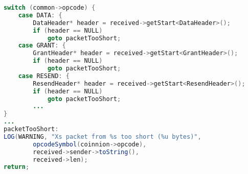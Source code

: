 \begin{lstlisting}[language=Java]
switch (common->opcode) { 
    case DATA: {
        DataHeader* header = received->getStart<DataHeader>(); 
        if (header == NULL)
            goto packetTooShort;
    case GRANT: {
        GrantHeader* header = received->getStart<GrantHeader>(); 
        if (header == NULL)
            goto packetTooShort;
    case RESEND: {
        ResendHeader* header = received->getStart<ResendHeader>(); 
        if (header == NULL)
            goto packetTooShort;
        ...
}
...
packetTooShort:
LOG(WARNING, "Xs packet from %s too short (%u bytes)", 
        opcodeSymbol(coinnion->opcode), 
        received->sender->toString(), 
        received->len);
return;
\end{lstlisting}